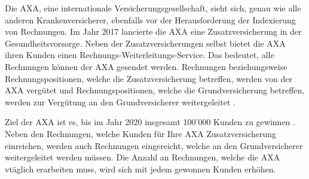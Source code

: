 \documentclass{hwz}
\begin{document}



Die AXA, eine internationale Versicherungsgesellschaft, sieht sich, genau wie alle anderen Krankenversicherer, ebenfalls vor der Herausforderung der Indexierung von Rechnungen. Im Jahr 2017 lancierte die AXA eine Zusatzversicherung in der Gesundheitsvorsorge. Neben der Zusatzversicherungen selbst bietet die AXA ihren Kunden einen Rechnungs-Weiterleitungs-Service. Das bedeutet, alle Rechnungen können der AXA gesendet werden. Rechnungen beziehungsweise Rechnungspositionen, welche die Zusatzversicherung betreffen, werden von der AXA vergütet und Rechnungspositionen, welche die Grundversicherung betreffen, werden zur Vergütung an den Grundversicherer weitergeleitet \autocite{finanzen.ch2017AxaGewinnen}.



Ziel der AXA ist es, bis im Jahr 2020 insgesamt 100'000 Kunden zu gewinnen \autocite{finanzen.ch2017AxaGewinnen}. Neben den Rechnungen, welche Kunden für Ihre AXA Zusatzversicherung einreichen, werden auch Rechnungen eingereicht, welche an den Grundversicherer weitergeleitet werden müssen. Die Anzahl an Rechnungen, welche die AXA vtäglich erarbeiten muss, wird sich mit jedem gewonnen Kunden erhöhen.
\end{document}

